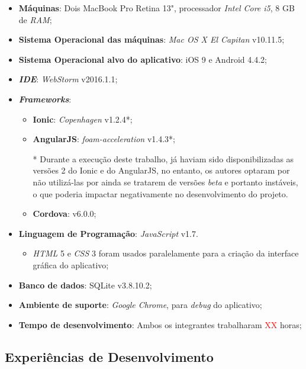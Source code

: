\begin{itemize}
    \item \textbf{Máquinas}: Dois MacBook Pro Retina 13", processador \textit{Intel Core i5}, 8 GB de \textit{RAM};
    \item \textbf{Sistema Operacional das máquinas}: \textit{Mac OS X El Capitan} v10.11.5;
    \item \textbf{Sistema Operacional alvo do aplicativo}: iOS 9 e Android 4.4.2;
    \item \textbf{\textit{IDE}}: \textit{WebStorm} v2016.1.1;
    \item \textbf{\textit{Frameworks}}:
    \begin{itemize}
        \item \textbf{Ionic}: \textit{Copenhagen} v1.2.4*;
        \item \textbf{AngularJS}: \textit{foam-acceleration} v1.4.3*;
        
        * Durante a execução deste trabalho, já haviam sido disponibilizadas as versões 2 do Ionic e do AngularJS, no entanto,
        os autores optaram por não utilizá-las por ainda se tratarem de versões \textit{beta} e portanto instáveis, o que poderia 
        impactar negativamente no desenvolvimento do projeto.
        
        \item \textbf{Cordova}: v6.0.0;
    \end{itemize}
    \item \textbf{Linguagem de Programação}: \textit{JavaScript} v1.7. 
    \begin{itemize}
        \item \textit{HTML} 5 e \textit{CSS} 3 foram usados paralelamente para a criação da interface gráfica do aplicativo;
    \end{itemize}
    \item \textbf{Banco de dados}: SQLite v3.8.10.2;
    \item \textbf{Ambiente de suporte}: \textit{Google Chrome}, para \textit{debug} do aplicativo;
    \item \textbf{Tempo de desenvolvimento}: Ambos os integrantes trabalharam \textcolor{red}{XX} horas;
\end{itemize}

\subsection{Experiências de Desenvolvimento} \label{subsec:experienciasdev}

